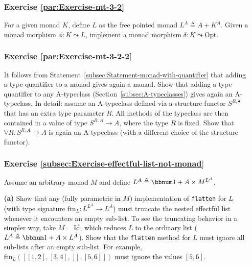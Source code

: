 \subsubsection{Exercise \label{par:Exercise-mt-3-2}\ref{par:Exercise-mt-3-2}}

For a given monad $K$, define $L$ as the free pointed monad
$L^{A}\triangleq A+K^{A}$. Given a monad morphism $\phi:K\leadsto L$,
implement a monad morphism $\delta:K\leadsto\text{Opt}$.

\subsubsection{Exercise \label{par:Exercise-mt-3-2-2}\ref{par:Exercise-mt-3-2-2}}

It follows from Statement~\ref{subsec:Statement-monad-with-quantifier}
that adding a type quantifier to a monad gives again a monad. Show
that adding a type quantifier to any A-typeclass (Section~\ref{subsec:A-typeclasses})
gives again an A-typeclass. In detail: assume an A-typeclass defined
via a structure functor $S^{R,\bullet}$ that has an extra type parameter
$R$. All methods of the typeclass are then contained in a value of
type $S^{R,A}\rightarrow A$, where the type $R$ is fixed. Show that
$\forall R.\,S^{R,A}\rightarrow A$ is again an A-typeclass (with
a different choice of the structure functor).

\subsubsection{Exercise \label{subsec:Exercise-effectful-list-not-monad}\ref{subsec:Exercise-effectful-list-not-monad}}

Assume an arbitrary monad $M$ and define $L^{A}\triangleq\bbnum 1+A\times M^{L^{A}}$.

\textbf{(a)} Show that any (fully parametric in $M$) implementation
of \lstinline!flatten! for $L$ (with type signature $\text{ftn}_{L}:L^{L^{A}}\rightarrow L^{A}$)
must truncate the nested effectful list whenever it encounters an
empty sub-list. To see the truncating behavior in a simpler way, take
$M=\text{Id}$, which reduces $L$ to the ordinary list ($L^{A}\triangleq\bbnum 1+A\times L^{A}$).
Show that the \lstinline!flatten! method for $L$ must ignore all
sub-lists after an empty sub-list. For example, $\text{ftn}_{L}(\left[\left[1,2\right],\left[3,4\right],\left[\right],\left[5,6\right]\right])$
must ignore the values $\left[5,6\right]$.

